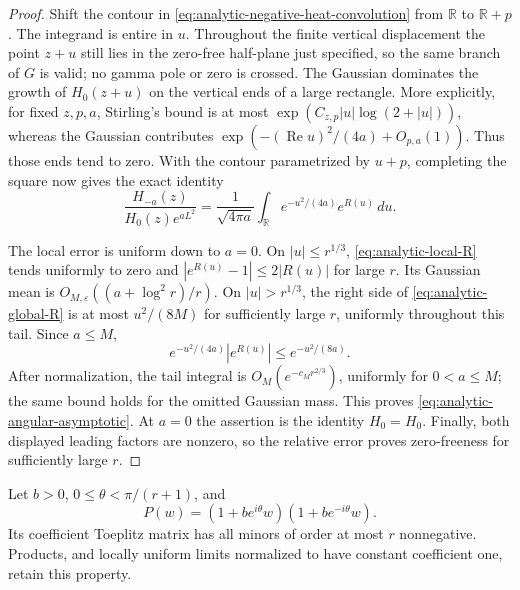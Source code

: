 \begin{proof}
Shift the contour in \eqref{eq:analytic-negative-heat-convolution}
from $\mathbb R$ to $\mathbb R+p$. The integrand is entire in
$u$. Throughout the finite vertical displacement the point $z+u$
still lies in the zero-free half-plane just specified, so the same
branch of $G$ is valid; no gamma pole or zero is crossed.
The Gaussian dominates the growth of $H_0(z+u)$ on the vertical
ends of a large rectangle. More explicitly, for fixed $z,p,a$,
Stirling's bound is at most
$\exp(C_{z,p}|u|\log(2+|u|))$, whereas the Gaussian contributes
$\exp(-(\operatorname{Re}u)^2/(4a)+O_{p,a}(1))$.
Thus those ends tend to zero. With the contour parametrized by
$u+p$, completing the square now gives the exact identity
\[
 \frac{H_{-a}(z)}{H_0(z)e^{aL^2}}
 =\frac1{\sqrt{4\pi a}}
     \int_{\mathbb R}e^{-u^2/(4a)}e^{R(u)}\,du.
\]

The local error is uniform down to $a=0$. On $|u|\le r^{1/3}$,
\eqref{eq:analytic-local-R} tends uniformly to zero and
$|e^{R(u)}-1|\le2|R(u)|$ for large $r$. Its Gaussian mean is
$O_{M,\varepsilon}((a+\log^2r)/r)$.
On $|u|>r^{1/3}$, the right side of
\eqref{eq:analytic-global-R} is at most $u^2/(8M)$ for sufficiently
large $r$, uniformly throughout this tail. Since $a\le M$,
\[
 e^{-u^2/(4a)}|e^{R(u)}|
       \le e^{-u^2/(8a)}.
\]
After normalization, the tail integral is
$O_M(e^{-c_Mr^{2/3}})$, uniformly for $0<a\le M$; the same
bound holds for the omitted Gaussian mass. This proves
\eqref{eq:analytic-angular-asymptotic}. At $a=0$ the assertion is
the identity $H_0=H_0$. Finally, both displayed leading factors
are nonzero, so the relative error proves zero-freeness for
sufficiently large $r$.
\end{proof}

\begin{lemma}
\label{lem:analytic-quadratic-pfr}
Let $b>0$, $0\le\theta<\pi/(r+1)$, and
\[
 P(w)=(1+be^{i\theta}w)(1+be^{-i\theta}w).
\]
Its coefficient Toeplitz matrix has all minors of order at most
$r$ nonnegative. Products, and locally uniform limits normalized
to have constant coefficient one, retain this property.
\end{lemma}

